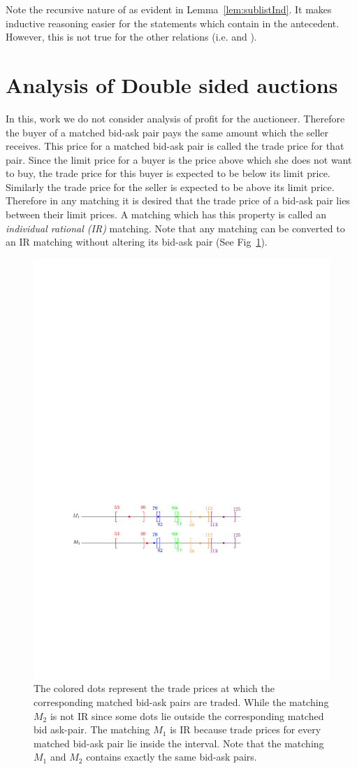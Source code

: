 \documentclass[a4paper,UKenglish,cleveref, autoref]{lipics-v2019}
\begin{document}
Note the recursive nature of  as evident in Lemma~\ref{lem:sublistInd}. It  makes inductive reasoning easier for the statements which contain  in the antecedent. However, this is  not true for the other relations (i.e.  and ).

\section{Analysis of Double sided auctions}\label{sec:analysis}
In this, work we do not consider analysis of profit for the auctioneer. Therefore the buyer of a matched bid-ask pair pays the same amount which the seller receives. This price for a matched  bid-ask pair is called the trade price for that pair. Since the limit price for a buyer is the price above which she does not want to buy, the trade price for this buyer is expected to be below its limit price. Similarly the trade price for the seller is expected to be above its limit price. Therefore in any matching it is desired that the trade price of a bid-ask pair lies between their limit prices. A matching which has this property is called an \emph{individual rational (IR)} matching. Note that any matching can be converted to an IR matching without altering its bid-ask pair (See Fig~\ref{fig:IR}).

\begin{figure}[h!]
\centering
\includegraphics[width=.6\textwidth]{brack_IR.pdf}
\caption{ The colored dots represent the trade prices at which the corresponding matched bid-ask pairs are traded. While the matching $M_2$ is not IR since some dots lie outside the corresponding matched bid ask-pair. The matching $M_1$ is IR because trade prices for every matched bid-ask pair  lie inside the interval. Note that the matching $M_1$ and $M_2$ contains exactly the same bid-ask pairs.}
\label{fig:IR}
\end{figure}
\end{document}
